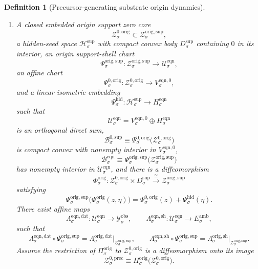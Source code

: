 \documentclass[11pt]{article}
\newcommand{\DataSpace}[1]{\mathcal Y_{#1}^{\mathrm{obs}}}
\newcommand{\AmbientTarget}[1]{E_{#1}^{\mathrm{amb}}}
\newcommand{\SeedHidden}[1]{\mathcal H_{#1}^{\mathrm{sup}}}
\newcommand{\SeedHiddenBody}[1]{D_{#1}^{\mathrm{sup}}}
\newcommand{\HiddenChart}[1]{\Psi_{#1}^{\mathrm{hid}}}
\newcommand{\ZeroBody}[1]{\mathcal B_{#1}^{0,\mathrm{sup}}}
\newcommand{\PrecZeroCore}[1]{\mathcal Z_{#1}^{0,\mathrm{prec}}}
\newcommand{\OrigProj}[1]{\Pi_{#1}^{\mathrm{orig}}}
\newcommand{\OrigData}[1]{\Lambda_{#1}^{\mathrm{orig,dat}}}
\newcommand{\OrigShellMap}[1]{\Lambda_{#1}^{\mathrm{orig,sh}}}
\newcommand{\OrigSupportShell}[1]{\mathcal Z_{#1}^{\mathrm{orig,sup}}}
\newcommand{\OrigZeroCore}[1]{\mathcal Z_{#1}^{0,\mathrm{orig}}}
\newcommand{\OrigEqChart}[1]{\Psi_{#1}^{\mathrm{orig,sup}}}
\newcommand{\OrigZeroChart}[1]{\Psi_{#1}^{0,\mathrm{orig}}}
\newcommand{\OrigSplit}[1]{\Phi_{#1}^{\mathrm{orig}}}
\newcommand{\EqnSpace}[1]{\mathcal U_{#1}^{\mathrm{eqn}}}
\newcommand{\EqnData}[1]{\Lambda_{#1}^{\mathrm{eqn,dat}}}
\newcommand{\EqnShell}[1]{\Lambda_{#1}^{\mathrm{eqn,sh}}}
\newcommand{\EqnHidden}[1]{H_{#1}^{\mathrm{eqn}}}
\newcommand{\EqnZero}[1]{V_{#1}^{\mathrm{eqn},0}}
\newcommand{\EqnBody}[1]{\mathcal B_{#1}^{\mathrm{eqn}}}
\newtheorem{definition}{Definition}
\begin{document}
\begin{definition}[Precursor-generating substrate origin dynamics]
\begin{enumerate}
    \item A closed embedded origin support zero core
    \[
    \OrigZeroCore{\sigma}\subset\OrigSupportShell{\sigma},
    \]
    a hidden-seed space \(\SeedHidden{\sigma}\) with compact convex body \(\SeedHiddenBody{\sigma}\) containing \(0\) in its interior, an origin support-shell chart
    \[
    \OrigEqChart{\sigma}:\OrigSupportShell{\sigma}\to\EqnSpace{\sigma},
    \]
    an affine chart
    \[
    \OrigZeroChart{\sigma}:\OrigZeroCore{\sigma}\to\EqnZero{\sigma},
    \]
    and a linear isometric embedding
    \[
    \HiddenChart{\sigma}:\SeedHidden{\sigma}\to\EqnHidden{\sigma}
    \]
    such that
    \[
    \EqnSpace{\sigma}
    =
    \EqnZero{\sigma}\oplus\EqnHidden{\sigma}
    \]
    is an orthogonal direct sum,
    \[
    \ZeroBody{\sigma}
    \equiv
    \OrigZeroChart{\sigma}\bigl(\OrigZeroCore{\sigma}\bigr)
    \]
    is compact convex with nonempty interior in \(\EqnZero{\sigma}\),
    \[
    \EqnBody{\sigma}
    \equiv
    \OrigEqChart{\sigma}\bigl(\OrigSupportShell{\sigma}\bigr)
    \]
    has nonempty interior in \(\EqnSpace{\sigma}\), and there is a diffeomorphism
    \begin{equation}
    \OrigSplit{\sigma}:
    \OrigZeroCore{\sigma}\times\SeedHiddenBody{\sigma}
    \xrightarrow{\cong}
    \OrigSupportShell{\sigma}
    \label{eq:origsplit}
    \end{equation}
    satisfying
    \begin{equation}
    \OrigEqChart{\sigma}\bigl(\OrigSplit{\sigma}(z,\eta)\bigr)
    =
    \OrigZeroChart{\sigma}(z)+\HiddenChart{\sigma}(\eta).
    \label{eq:origchartsplit}
    \end{equation}
    There exist affine maps
    \[
    \EqnData{\sigma}:\EqnSpace{\sigma}\to\DataSpace{\sigma},
    \qquad
    \EqnShell{\sigma}:\EqnSpace{\sigma}\to\AmbientTarget{\sigma},
    \]
    such that
    \begin{equation}
    \EqnData{\sigma}\circ\OrigEqChart{\sigma}
    =
    \OrigData{\sigma}\big|_{\OrigSupportShell{\sigma}},
    \qquad
    \EqnShell{\sigma}\circ\OrigEqChart{\sigma}
    =
    \OrigShellMap{\sigma}\big|_{\OrigSupportShell{\sigma}}.
    \label{eq:origeqnchartreadouts}
    \end{equation}
    Assume the restriction of \(\OrigProj{\sigma}\) to \(\OrigZeroCore{\sigma}\) is a diffeomorphism onto its image
    \[
    \PrecZeroCore{\sigma}
    \equiv
    \OrigProj{\sigma}\bigl(\OrigZeroCore{\sigma}\bigr).
    \]


\end{enumerate}
\end{definition}
\end{document}
